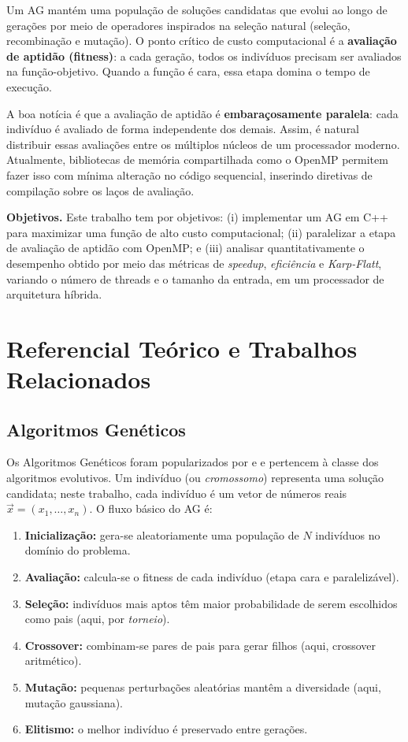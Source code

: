 \documentclass[12pt]{article}
\begin{document}
Um AG mantém uma população de soluções candidatas que evolui ao longo de
gerações por meio de operadores inspirados na seleção natural (seleção,
recombinação e mutação). O ponto crítico de custo computacional é a
\textbf{avaliação de aptidão (fitness)}: a cada geração, todos os indivíduos
precisam ser avaliados na função-objetivo. Quando a função é cara, essa etapa
domina o tempo de execução.

A boa notícia é que a avaliação de aptidão é \textbf{embaraçosamente
paralela}: cada indivíduo é avaliado de forma independente dos demais. Assim,
é natural distribuir essas avaliações entre os múltiplos núcleos de um
processador moderno. Atualmente, bibliotecas de memória compartilhada como o
OpenMP permitem fazer isso com mínima alteração no código sequencial,
inserindo diretivas de compilação sobre os laços de avaliação.

\textbf{Objetivos.} Este trabalho tem por objetivos: (i) implementar um AG em
C++ para maximizar uma função de alto custo computacional; (ii) paralelizar a
etapa de avaliação de aptidão com OpenMP; e (iii) analisar quantitativamente o
desempenho obtido por meio das métricas de \emph{speedup}, \emph{eficiência} e
\emph{Karp-Flatt}, variando o número de threads e o tamanho da entrada, em um
processador de arquitetura híbrida.

\section{Referencial Teórico e Trabalhos Relacionados}

\subsection{Algoritmos Genéticos}

Os Algoritmos Genéticos foram popularizados por \cite{holland:75} e
\cite{goldberg:89} e pertencem à classe dos algoritmos evolutivos. Um
indivíduo (ou \emph{cromossomo}) representa uma solução candidata; neste
trabalho, cada indivíduo é um vetor de números reais
$\vec{x} = (x_1, \ldots, x_n)$. O fluxo básico do AG é:

\begin{enumerate}
  \item \textbf{Inicialização:} gera-se aleatoriamente uma população de
    $N$ indivíduos no domínio do problema.
  \item \textbf{Avaliação:} calcula-se o fitness de cada indivíduo
    (etapa cara e paralelizável).
  \item \textbf{Seleção:} indivíduos mais aptos têm maior probabilidade de
    serem escolhidos como pais (aqui, por \emph{torneio}).
  \item \textbf{Crossover:} combinam-se pares de pais para gerar filhos
    (aqui, crossover aritmético).
  \item \textbf{Mutação:} pequenas perturbações aleatórias mantêm a
    diversidade (aqui, mutação gaussiana).
  \item \textbf{Elitismo:} o melhor indivíduo é preservado entre gerações.
\end{enumerate}
\end{document}
